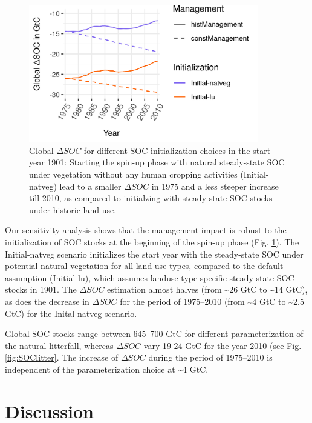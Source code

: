 \documentclass[gc, manuscript]{copernicus}
\begin{document}
\begin{figure}[h]
\includegraphics[width=10cm]{../ResultNotebooks/Output/Images/scenario_init} \caption{Global $\Delta SOC$ for different SOC initialization choices in the start year 1901: Starting the spin-up phase with natural steady-state SOC under vegetation without any human cropping activities (Initial-natveg) lead to a smaller $\Delta SOC$ in 1975 and a less steeper increase till 2010, as compared to initialzing with steady-state SOC stocks under historic land-use.}\label{fig:SOCinit}
\end{figure}

Our sensitivity analysis shows that the management impact is robust to the initialization of SOC stocks at the beginning of the spin-up phase (Fig. \ref{fig:SOCinit}). The Initial-natveg scenario initializes the start year with the steady-state SOC under potential natural vegetation for all land-use types, compared to the default assumption (Initial-lu), which assumes landuse-type specific steady-state SOC stocks in 1901. The \(\Delta SOC\) estimation almost halves (from \textasciitilde26 GtC to \textasciitilde14 GtC), as does the decrease in \(\Delta SOC\) for the period of 1975--2010 (from \textasciitilde4 GtC to \textasciitilde2.5 GtC) for the Inital-natveg scenario.

Global SOC stocks range between 645--700 GtC for different parameterization of the natural litterfall, whereas \(\Delta SOC\) vary 19-24 GtC for the year 2010 (see Fig. \ref{fig:SOClitter}. The increase of \(\Delta SOC\) during the period of 1975--2010 is independent of the parameterization choice at \textasciitilde4 GtC.

\newpage

\hypertarget{discussion}{%
\section{Discussion}\label{discussion}}
\end{document}
